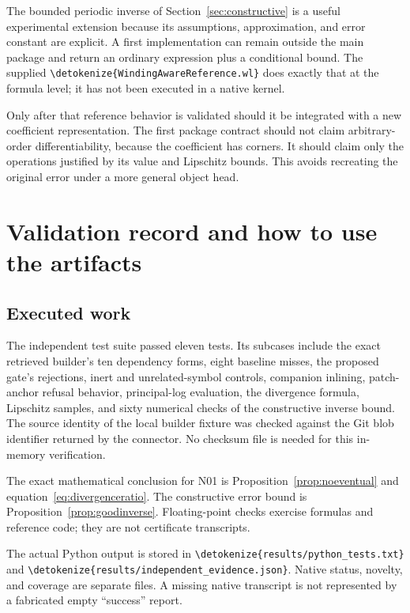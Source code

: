 \documentclass[11pt,a4paper]{article}
\newcommand{\wl}[1]{\texttt{\expandafter\nolinkurl\expandafter{\detokenize{#1}}}}
\begin{document}
The bounded periodic inverse of Section~\ref{sec:constructive} is a useful
experimental extension because its assumptions, approximation, and error
constant are explicit. A first implementation can remain outside the main
package and return an ordinary expression plus a conditional bound. The supplied
\wl{WindingAwareReference.wl} does exactly that at the formula level; it has not
been executed in a native kernel.

Only after that reference behavior is validated should it be integrated with a
new coefficient representation. The first package contract should not claim
arbitrary-order differentiability, because the coefficient has corners. It
should claim only the operations justified by its value and Lipschitz bounds.
This avoids recreating the original error under a more general object head.

\section{Validation record and how to use the artifacts}

\subsection{Executed work}

The independent test suite passed eleven tests. Its subcases include the exact
retrieved builder's ten dependency forms, eight baseline misses, the proposed
gate's rejections, inert and unrelated-symbol controls, companion inlining,
patch-anchor refusal behavior, principal-log evaluation, the divergence formula,
Lipschitz samples, and sixty numerical checks of the constructive inverse bound.
The source identity of the local builder fixture was checked against the Git
blob identifier returned by the connector. No checksum file is needed for this
in-memory verification.

The exact mathematical conclusion for N01 is Proposition~\ref{prop:noeventual}
and equation~\eqref{eq:divergenceratio}. The constructive error bound is
Proposition~\ref{prop:goodinverse}. Floating-point checks exercise formulas and
reference code; they are not certificate transcripts.

The actual Python output is stored in \wl{results/python_tests.txt} and
\wl{results/independent_evidence.json}. Native status, novelty, and coverage are
separate files. A missing native transcript is not represented by a fabricated
empty ``success'' report.
\end{document}

